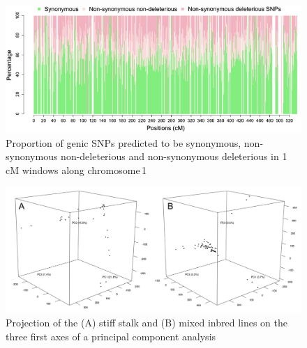 \documentclass[12pt]{article}
\begin{document}
\begin{figure}[ht]
  \begin{center}
   \includegraphics[width=140mm]{PerDelGenome_ch1cM.jpg}
    \caption{Proportion of genic SNPs predicted to be synonymous, non-synonymous non-deleterious and non-synonymous deleterious in 1\,cM windows along chromosome\,1} 
   \label{non_syn_chr1cM}
  \end{center}
\end{figure}

\begin{figure}[h]
  \begin{center}
   \includegraphics[width=150mm]{PCA.png}
    \caption{Projection of the (A) stiff stalk and (B) mixed inbred lines on the three first axes of a principal component analysis}
   \label{figureS3}
  \end{center}
\end{figure}

\end{document}

